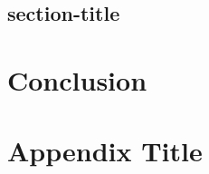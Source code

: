 \documentclass[12pt,twoside]{report}
\begin{document}
\section{section-title}
\blindtext[3]

\chapter{Conclusion}

\blindtext
\blindtext[3]
\blindtext[3]



\appendix
\chapter{Appendix Title}

\blindtext
\blindtext

\printbibliography
\end{document}
